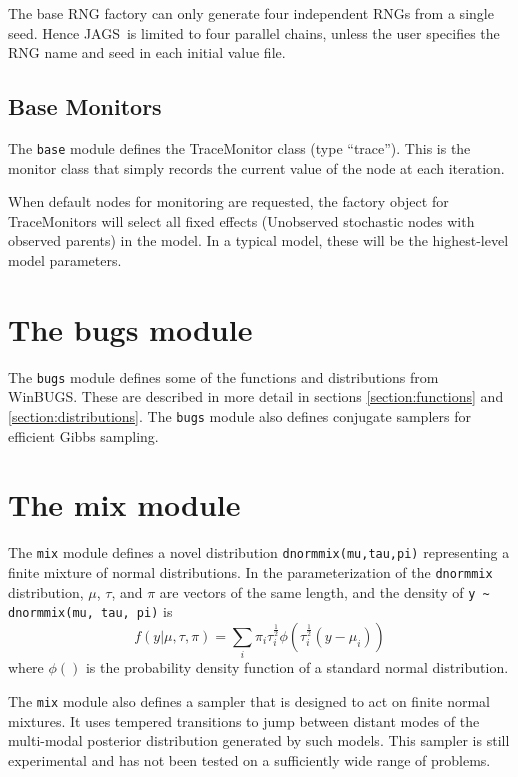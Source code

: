 \documentclass[11pt, a4paper, titlepage]{report}
\newcommand{\JAGS}{\textsf{JAGS}}
\newcommand{\WinBUGS}{\textsf{WinBUGS}}
\begin{document}
The base RNG factory can only generate four independent RNGs from a
single seed. Hence \JAGS\ is limited to four parallel chains, unless
the user specifies the RNG name and seed in each initial value file.

\subsection{Base Monitors}

The \verb+base+ module defines the TraceMonitor class (type
``trace''). This is the monitor class that simply records the current
value of the node at each iteration.

When default nodes for monitoring are requested, the factory object
for TraceMonitors will select all fixed effects (Unobserved stochastic
nodes with observed parents) in the model. In a typical model, these
will be the highest-level model parameters.

\section{The bugs module}

The \verb+bugs+ module defines some of the functions and distributions
from \WinBUGS. These are described in more detail in sections
\ref{section:functions} and \ref{section:distributions}.  The
\verb+bugs+ module also defines conjugate samplers for efficient Gibbs
sampling.

\section{The mix module}

The \verb+mix+ module defines a novel distribution
\verb+dnormmix(mu,tau,pi)+ representing a finite mixture of normal
distributions. In the parameterization of the \verb+dnormmix+
distribution, $\mu$, $\tau$, and $\pi$ are vectors of the same length,
and the density of \verb+y ~ dnormmix(mu, tau, pi)+ is
\[
f(y | \mu, \tau, \pi) = \sum_i \pi_i \tau_i^{\frac{1}{2}} \phi( \tau^{\frac{1}{2}}_i (y - \mu_i))
\]
where $\phi()$ is the probability density function of a standard
normal distribution.

The \verb+mix+ module also defines a sampler that is designed to act
on finite normal mixtures. It uses tempered transitions to jump
between distant modes of the multi-modal posterior distribution
generated by such models. This sampler is still experimental and has
not been tested on a sufficiently wide range of problems.
\end{document}
